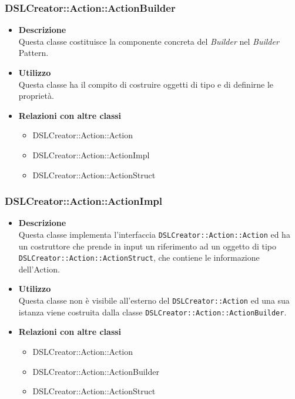  \subsubsection{DSLCreator::Action::ActionBuilder}
                    \begin{itemize}
                        \item \textbf{Descrizione} \hfill \\
                          Questa classe costituisce la componente concreta del \textit{Builder} nel \textit{Builder} Pattern.
                        \item \textbf{Utilizzo} \hfill \\
                          Questa classe ha il compito di costruire oggetti di tipo  e di definirne le proprietà.
                        \item \textbf{Relazioni con altre classi}
                            \begin{itemize}
                              \item DSLCreator::Action::Action
                              \item DSLCreator::Action::ActionImpl
                              \item DSLCreator::Action::ActionStruct
                            \end{itemize}
                    \end{itemize}  

 \subsubsection{DSLCreator::Action::ActionImpl}
                    \begin{itemize}
                        \item \textbf{Descrizione} \hfill \\
                          Questa classe implementa l'interfaccia \texttt{DSLCreator::Action::Action} ed ha un costruttore che prende in input un riferimento ad un oggetto di tipo \texttt{DSLCrea\-tor::Action::ActionStruct}, che contiene le informazione dell'Action.
                        \item \textbf{Utilizzo} \hfill \\
                          Questa classe non è visibile all'esterno del  \texttt{DSLCreator::Action} ed una sua istanza viene costruita dalla classe \texttt{DSLCreator::Action::ActionBuilder}.
                        \item \textbf{Relazioni con altre classi}
                            \begin{itemize}
                              \item DSLCreator::Action::Action
                              \item DSLCreator::Action::ActionBuilder
                              \item DSLCreator::Action::ActionStruct
                            \end{itemize}
                    \end{itemize}  

